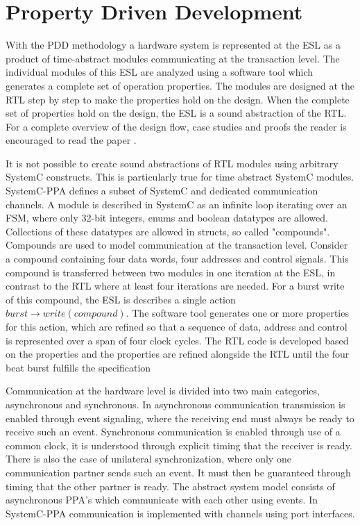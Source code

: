 \section{Property Driven Development}
\label{sec:pdd}
With the PDD methodology a hardware system is represented at the ESL as a product of time-abstract modules communicating at the transaction level. The individual modules of this ESL are analyzed using a software tool \cite{descam} which generates a complete set of operation properties. The modules are designed at the RTL step by step to make the properties hold on the design. When the complete set of properties hold on the design, the ESL is a sound abstraction of the RTL. For a complete overview of the design flow, case studies and proofs the reader is encouraged to read the paper \cite{pddref}. \par
It is not possible to create sound abstractions of RTL modules using arbitrary SystemC constructs. This is particularly true for time abstract SystemC modules. SystemC-PPA defines a subset of SystemC and dedicated communication channels. A module is described in SystemC as an infinite loop iterating over an FSM, where only 32-bit integers, enums and boolean datatypes are allowed. Collections of these datatypes are allowed in structs, so called "compounds". Compounds are used to model communication at the transaction level. Consider a compound containing four data words, four addresses and control signals. This compound is transferred between two modules in one iteration at the ESL, in contrast to the RTL where at least four iterations are needed. For a burst write of this compound, the ESL is describes a single action $burst\rightarrow write(compound)$. The software tool generates one or more properties for this action, which are refined so that a sequence of data, address and control is represented over a span of four clock cycles. The RTL code is developed based on the properties and the properties are refined alongside the RTL until the four beat burst fulfills the specification \par
Communication at the hardware level is divided into two main categories, asynchronous and synchronous. In asynchronous communication transmission is enabled through event signaling, where the receiving end must always be ready to receive such an event. Synchronous communication is enabled through use of a common clock, it is understood through explicit timing that the receiver is ready. There is also the case of unilateral synchronization, where only one communication partner sends such an event. It must then be guaranteed through timing that the other partner is ready. The abstract system model consists of asynchronous PPA's which communicate with each other using events. In SystemC-PPA communication is implemented with channels using port interfaces.


